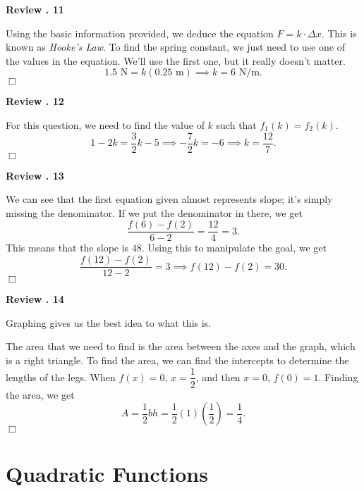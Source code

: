 \documentclass[lang=en,11pt]{elegantbook}
\begin{document}
\noindent \textbf{Review . 11}

Using the basic information provided, we deduce the equation $F=k\cdot \Delta x$.  This is known as \textit{Hooke's Law}.  To find the spring constant, we just need to use one of the values in the equation.  We'll use the first one, but it really doesn't matter.  $$1.5\text{ N}=k(0.25\text{ m}) \implies \boxed{k=6 \text{ N}/\text{m}}.$$ $\Box$\vspace{3mm}

\noindent \textbf{Review . 12}

For this question, we need to find the value of $k$ such that $f_1(k)=f_2(k).$  $$1-2k=\dfrac{3}{2}k-5 \implies -\dfrac{7}{2}k=-6 \implies \boxed{k=\dfrac{12}{7}}.$$ $\Box$\vspace{3mm}

\noindent \textbf{Review . 13}

We can see that the first equation given almost represents slope; it's simply missing the denominator.  If we put the denominator in there, we get $$\dfrac{f(6)-f(2)}{6-2}=\dfrac{12}{4}=3.$$  This means that the slope is $48$.  Using this to manipulate the goal, we get $$\dfrac{f(12)-f(2)}{12-2}=3 \implies f(12)-f(2)=\boxed{30}.$$ $\Box$\vspace{3mm}

\noindent \textbf{Review . 14}

Graphing gives us the best idea to what this is.  

\begin{figure}[!ht]
    \centering
\end{figure}

The area that we need to find is the area between the axes and the graph, which is a right triangle.  To find the area, we can find the intercepts to determine the lengths of the legs.  When $f(x)=0$, $x=\dfrac{1}{2}$, and then $x=0$, $f(0)=1$.  Finding the area, we get $$A=\dfrac{1}{2}bh=\dfrac{1}{2}\left(1\right)\left(\dfrac{1}{2}\right)=\boxed{\dfrac{1}{4}}.$$ $\Box$\vspace{3mm}
\chapter{Quadratic Functions}
\end{document}

